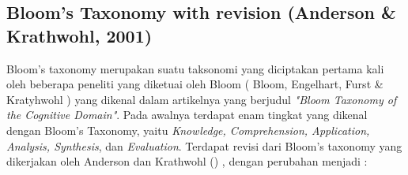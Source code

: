 	\subsection{Bloom's Taxonomy with revision (Anderson \& Krathwohl, 2001)}
	Bloom's taxonomy merupakan suatu taksonomi yang diciptakan pertama kali oleh beberapa peneliti yang diketuai oleh Bloom ( Bloom, Engelhart, Furst \& Kratyhwohl \citeyear{papper.bloom}) yang dikenal dalam artikelnya yang berjudul \textit{"Bloom Taxonomy of the Cognitive Domain"}. Pada awalnya terdapat enam tingkat yang dikenal dengan Bloom's Taxonomy, yaitu \textit{Knowledge, Comprehension, Application, Analysis, Synthesis}, dan \textit{Evaluation}. 
	\linebreak \linebreak
	Terdapat revisi dari Bloom's taxonomy yang dikerjakan oleh Anderson dan Krathwohl (\citeyear{paper.karthwohl}) , dengan perubahan menjadi :
